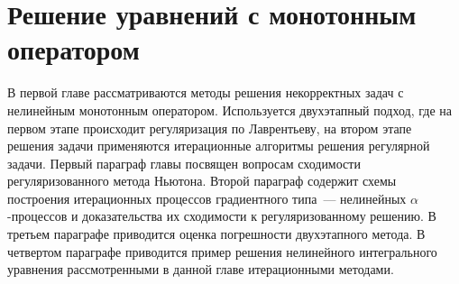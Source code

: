 \chapter{Решение уравнений с монотонным оператором}
В первой главе рассматриваются методы решения некорректных задач с нелинейным монотонным оператором. Используется двухэтапный подход, где на первом этапе происходит регуляризация по Лаврентьеву, на втором этапе решения задачи применяются итерационные алгоритмы решения регулярной задачи. Первый параграф главы посвящен вопросам сходимости регуляризованного метода Ньютона. Второй параграф содержит схемы построения итерационных процессов градиентного типа~--- нелинейных $\alpha$-процессов и доказательства их сходимости к регуляризованному решению. В третьем параграфе приводится оценка погрешности двухэтапного метода. В четвертом параграфе приводится пример решения  нелинейного интегрального уравнения рассмотренными в данной главе итерационными методами.

\newpage
